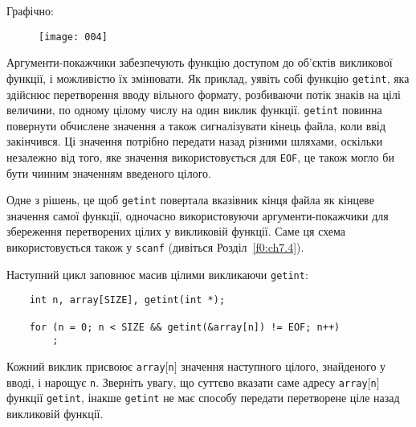 \documentclass[a4paper,12pt]{book}
\begin{document}
  Графічно:
  \begin{figure}[H]
  \centering
  \texttt{[image: 004]}
  \end{figure}

  Аргументи-покажчики забезпечують функцію доступом до об'єктів викликової функції, і
  можливістю їх змінювати. Як приклад, уявіть собі функцію \texttt{getint}, яка здійснює
  перетворення вводу вільного формату, розбиваючи потік знаків на цілі величини, по одному
  цілому числу на один виклик функції. \texttt{getint} повинна повернути обчислене
  значення а також сигналізувати кінець файла, коли ввід закінчився. Ці значення потрібно
  передати назад різними шляхами, оскільки незалежно від того, яке значення
  використовується для \texttt{EOF}, це також могло би бути чинним значенням введеного
  цілого.

  Одне з рішень, це щоб \texttt{getint} повертала вказівник кінця файла як кінцеве
  значення самої функції, одночасно використовуючи аргументи-покажчики для збереження
  перетворених цілих у викликовій функції. Саме ця схема використовується також у
  \texttt{scanf} (дивіться Розділ~\ref{f0:ch7.4}).

  Наступний цикл заповнює масив цілими викликаючи \texttt{getint}:
  \begin{verbatim}
    int n, array[SIZE], getint(int *);

    for (n = 0; n < SIZE && getint(&array[n]) != EOF; n++)
        ;
  \end{verbatim}

  Кожний виклик присвоює \texttt{array\mbox{$[$}n\mbox{$]$}} значення наступного цілого,
  знайденого у вводі, і нарощує \texttt{n}. Зверніть увагу, що суттєво вказати саме адресу
  \texttt{array\mbox{$[$}n\mbox{$]$}} функції \texttt{getint}, інакше \texttt{getint} не
  має способу передати перетворене ціле назад викликовій функції.
\end{document}
